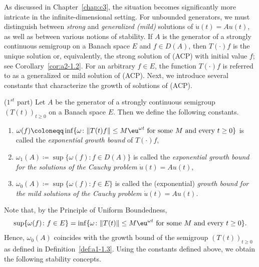 As discussed in Chapter~\ref{chap:c3}, the situation becomes significantly more intricate in the infinite-dimensional setting. 
For unbounded generators, we must distinguish between \emph{strong} and \emph{generalized (mild)} solutions of\/ $\dot{u}(t) = Au(t)$, as well as between various notions of stability.
If\/ $A$ is the generator of a strongly continuous semigroup on a Banach space $E$ and $f \in D(A)$, then $T(\cdot)f$ is the unique solution or, equivalently, the strong solution of (ACP) with initial value $f$; 
see Corollary~\ref{cor:a2-1.2}.
For an arbitrary $f \in E$, the function $T(\cdot)f$ is referred to as a generalized or mild solution of (ACP). 
Next, we introduce several constants that characterize the growth of solutions of (ACP).
\begin{definition}($1^{st}$ part)\label{def:a4-1.1} 
Let $A$ be the generator of a strongly continuous semigroup $ (T(t))_{t \geq 0} $ on a Banach space $E$. 
Then we define the following constants.
\begin{enumerate}[\upshape (i)]
\item 
$\omega(f) \coloneqq \inf\{\omega \colon \|T(t)f\| \leq M\eu^{\omega t} \text{ for some } M \text{ and every } t \geq 0\}$ is called the \emph{exponential growth bound} of\/ $T(\cdot)f$,

\item 
$\omega_{1}(A) \coloneqq \sup\{\omega(f) \colon f \in D(A)\}$ is called the \emph{exponential growth bound for the solutions of the Cauchy problem} $\dot{u}(t) = Au(t)$,

\item 
$\omega_{0}(A) \coloneqq \sup\{\omega(f) \colon f \in E\}$ is called the (exponential) \emph{growth bound for the mild solutions of the Cauchy problem} $\dot{u}(t) = Au(t)$.
\end{enumerate}
\end{definition}
Note that, by the Principle of Uniform Boundedness, 
\[
\sup\{\omega(f) \colon f \in E\} 
= \inf \{ \omega \colon \|T(t)\| \leq M\eu^{\omega t} 
    \text{ for some $M$ and every $t \geq 0 $}\}.
\]
Hence, $\omega_{0}(A)$ coincides with the growth bound of the semigroup $(T(t))_{t \geq 0}$ as defined in Definition~\ref{def:a1-1.3}. 
Using the constants defined above, we obtain the following stability concepts.
\setcounter{theorem}{0}
